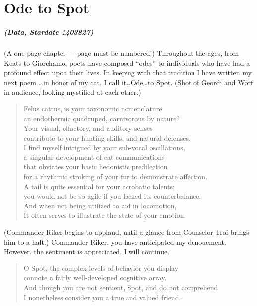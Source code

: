 
\chapter{Ode to Spot}	\OnePageChapter %

\noindent\paragraph{(Data, Stardate 1403827)} (A one-page chapter --- page must
be numbered!) Throughout the ages, from Keats to Giorchamo, poets have composed
``odes'' to individuals who have had a profound effect upon their lives.  In
keeping with that tradition I have written my next poem \ldots in honor of my
cat.  I call it\ldots{}Ode\ldots{}to Spot.  (Shot of Geordi and Worf in
audience, looking mystified at each other.)

\begin{quotation}
\noindent Felus cattus, is your taxonomic nomenclature \\
an endothermic quadruped, carnivorous by nature? \\
Your visual, olfactory, and auditory senses \\
contribute to your hunting skills, and natural defenses. \\
I find myself intrigued by your sub-vocal oscillations, \\
a singular development of cat communications \\
that obviates your basic hedonistic predilection \\
for a rhythmic stroking of your fur to demonstrate affection. \\
A tail is quite essential for your acrobatic talents; \\
you would not be so agile if you lacked its counterbalance. \\
And when not being utilized to aid in locomotion, \\
It often serves to illustrate the state of your emotion.
\end{quotation}

\noindent(Commander Riker begins to applaud, until a glance from Counselor Troi
brings him to a halt.) Commander Riker, you have anticipated my denouement.
However, the sentiment is appreciated.  I will continue.

\begin{quotation}
\noindent O Spot, the complex levels of behavior you display \\
connote a fairly well-developed cognitive array. \\
And though you are not sentient, Spot, and do not comprehend \\
I nonetheless consider you a true and valued friend.
\end{quotation}
